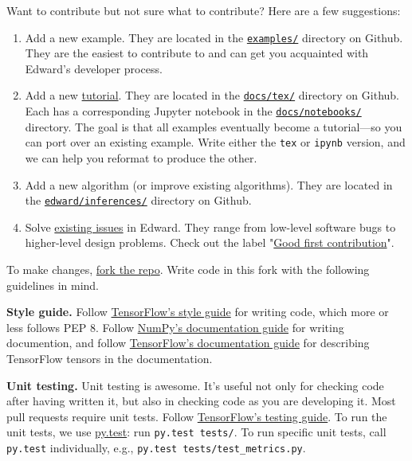 Want to contribute but not sure what to contribute? Here are a few
suggestions:
\begin{enumerate}
\item
Add a new example.  They are located in the
\href{https://github.com/blei-lab/edward/tree/master/examples}
{\texttt{examples/}} directory on Github.
They are the easiest to contribute to and
can get you acquainted with Edward's developer process.
\item
Add a new \href{/tutorials}{tutorial}. They are located in the
\href{https://github.com/blei-lab/edward/tree/master/docs/tex}
{\texttt{docs/tex/}} directory on Github.
Each has a corresponding Jupyter notebook in the
\href{https://github.com/blei-lab/edward/tree/master/docs/notebooks}
{\texttt{docs/notebooks/}} directory.
The goal is that all examples eventually become a tutorial---so you
can port over an existing example. Write either the \texttt{tex} or
\texttt{ipynb} version, and we can help you reformat to produce the
other.
\item
Add a new algorithm (or improve existing algorithms).
They are located in the
\href{https://github.com/blei-lab/edward/tree/master/edward/inferences}
{\texttt{edward/inferences/}} directory on Github.
\item
Solve
\href{https://github.com/blei-lab/edward/issues}{existing issues}
in Edward. They range from low-level software bugs to higher-level
design problems. Check out the label
"\href{https://github.com/blei-lab/edward/issues?q=is%3Aissue+is%3Aopen+label%3A%22Good+first+contribution%22}
{Good first contribution}".
\end{enumerate}

To make changes,
\href{https://help.github.com/articles/working-with-forks/}{fork the repo}.
Write code in this fork with the following guidelines in mind.

\textbf{Style guide.}
Follow
\href{https://www.tensorflow.org/versions/master/how_tos/style_guide.html}{TensorFlow's
style guide}
for writing code, which more or less follows PEP 8.
Follow
\href{https://github.com/numpy/numpy/blob/master/doc/HOWTO_DOCUMENT.rst.txt}
{NumPy's documentation guide}
for writing documention,
and follow
\href{https://www.tensorflow.org/versions/master/how_tos/documentation/index.html}{TensorFlow's documentation guide}
for describing TensorFlow tensors in the documentation.

\textbf{Unit testing.}
Unit testing is awesome. It's useful not only
for checking code after having written it, but also in checking code
as you are developing it.
Most pull requests require unit tests.
Follow
\href{https://www.tensorflow.org/versions/master/api_docs/python/test.html}
{TensorFlow's testing guide}.
To run the unit tests, we use
\href{http://doc.pytest.org/}{py.test}:
run \texttt{py.test tests/}.
To run specific unit tests, call \texttt{py.test} individually, e.g., \texttt{py.test tests/test_metrics.py}.

